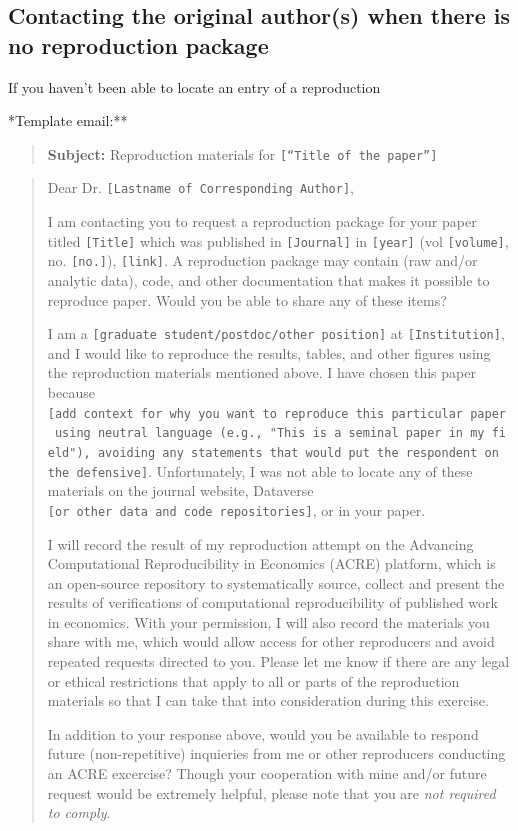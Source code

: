 \documentclass[]{book}
\begin{document}
\hypertarget{contacting-the-original-authors-when-there-is-no-reproduction-package}{%
\subsection{Contacting the original author(s) when there is no reproduction package}\label{contacting-the-original-authors-when-there-is-no-reproduction-package}}

If you haven't been able to locate an entry of a reproduction

*Template email:**

\begin{quote}
\textbf{Subject:} Reproduction materials for \texttt{{[}“Title\ of\ the\ paper”{]}}
\end{quote}

\begin{quote}
Dear Dr. \texttt{{[}Lastname\ of\ Corresponding\ Author{]}},

I am contacting you to request a reproduction package for your paper titled \texttt{{[}Title{]}} which was published in \texttt{{[}Journal{]}} in \texttt{{[}year{]}} (vol \texttt{{[}volume{]}}, no. \texttt{{[}no.{]}}), \texttt{{[}link{]}}. A reproduction package may contain (raw and/or analytic data), code, and other documentation that makes it possible to reproduce paper. Would you be able to share any of these items?

I am a \texttt{{[}graduate\ student/postdoc/other\ position{]}} at \texttt{{[}Institution{]}}, and I would like to reproduce the results, tables, and other figures using the reproduction materials mentioned above. I have chosen this paper because \texttt{{[}add\ context\ for\ why\ you\ want\ to\ reproduce\ this\ particular\ paper\ using\ neutral\ language\ (e.g.,\ "This\ is\ a\ seminal\ paper\ in\ my\ field"),\ avoiding\ any\ statements\ that\ would\ put\ the\ respondent\ on\ the\ defensive{]}}. Unfortunately, I was not able to locate any of these materials on the journal website, Dataverse \texttt{{[}or\ other\ data\ and\ code\ repositories{]}}, or in your paper.

I will record the result of my reproduction attempt on the Advancing Computational Reproducibility in Economics (ACRE) platform, which is an open-source repository to systematically source, collect and present the results of verifications of computational reproducibility of published work in economics. With your permission, I will also record the materials you share with me, which would allow access for other reproducers and avoid repeated requests directed to you. Please let me know if there are any legal or ethical restrictions that apply to all or parts of the reproduction materials so that I can take that into consideration during this exercise.

In addition to your response above, would you be available to respond future (non-repetitive) inquieries from me or other reproducers conducting an ACRE excercise? Though your cooperation with mine and/or future request would be extremely helpful, please note that you are \emph{not required to comply}.
\end{quote}
\end{document}
